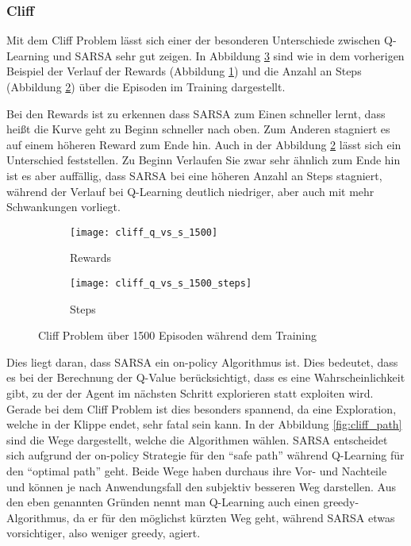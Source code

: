 \subsubsection{Cliff}

Mit dem Cliff Problem lässt sich einer der besonderen Unterschiede zwischen Q-Learning und SARSA sehr gut zeigen. In Abbildung \ref{fig:cliff_train} sind wie in dem vorherigen Beispiel der Verlauf der Rewards (Abbildung \ref{fig:cliff_rew}) und die Anzahl an Steps (Abbildung \ref{fig:cliff_step}) über die Episoden im Training dargestellt.

Bei den Rewards ist zu erkennen dass SARSA zum Einen schneller lernt, dass heißt die Kurve geht zu Beginn schneller nach oben. Zum Anderen stagniert es auf einem höheren Reward zum Ende hin. Auch in der Abbildung \ref{fig:cliff_step} lässt sich ein Unterschied feststellen. Zu Beginn Verlaufen Sie zwar sehr ähnlich zum Ende hin ist es aber auffällig, dass SARSA bei eine höheren Anzahl an Steps stagniert, während der Verlauf bei Q-Learning deutlich niedriger, aber auch mit mehr Schwankungen vorliegt.




\begin{figure}[H]
    \centering
    \begin{subfigure}{.5\textwidth}
      \centering
      \texttt{[image: cliff\_q\_vs\_s\_1500]}
      \caption{Rewards}
      \label{fig:cliff_rew}
    \end{subfigure}%
    \begin{subfigure}{.5\textwidth}
      \centering
      \texttt{[image: cliff\_q\_vs\_s\_1500\_steps]}
      \caption{Steps}
      \label{fig:cliff_step}
    \end{subfigure}
    \caption{Cliff Problem über 1500 Episoden während dem Training}
    \label{fig:cliff_train}
\end{figure}

Dies liegt daran, dass SARSA ein on-policy Algorithmus ist. Dies bedeutet, dass es bei der Berechnung der Q-Value berücksichtigt, dass es eine Wahrscheinlichkeit gibt, zu der der Agent im nächsten Schritt explorieren statt exploiten wird.
Gerade bei dem Cliff Problem ist dies besonders spannend, da eine Exploration, welche in der Klippe endet, sehr fatal sein kann. In der Abbildung \ref{fig:cliff_path} sind die Wege dargestellt, welche die Algorithmen wählen. SARSA entscheidet sich aufgrund der on-policy Strategie für den ``safe path'' während Q-Learning für den ``optimal path'' geht. 
Beide Wege haben durchaus ihre Vor- und Nachteile und können je nach Anwendungsfall den subjektiv besseren Weg darstellen.
Aus den eben genannten Gründen nennt man Q-Learning auch einen greedy-Algorithmus, da er für den möglichst kürzten Weg geht, während SARSA etwas vorsichtiger, also weniger greedy, agiert.

